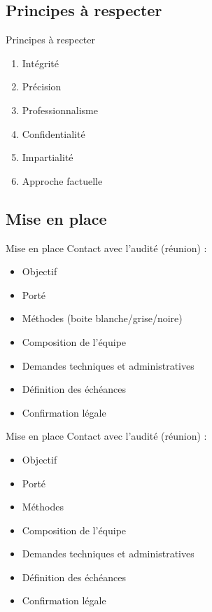 \documentclass{beamer}
\newcommand{\colorized}[1]{{\color{red}{#1}}}
\begin{document}
	\subsection{Principes à respecter}
	\begin{frame}{Principes à respecter}
		\begin{enumerate}
			\item Intégrité
			\item Précision
			\item Professionnalisme
			\item Confidentialité
			\item Impartialité
			\item Approche factuelle
		\end{enumerate}
	
	\end{frame}


	\subsection{Mise en place}
	\begin{frame}{Mise en place}
	     Contact avec l'audité (réunion) : 
		\begin{itemize}
			\item Objectif
			\item Porté
			\item Méthodes (boite blanche/grise/noire)
			\item Composition de l'équipe
			\item Demandes techniques et administratives
			\item Définition des échéances
			\item Confirmation légale
		\end{itemize}		
	\end{frame}

	\begin{frame}{Mise en place}
		Contact avec l'audité (réunion) : 
		\begin{itemize}
			\item Objectif \colorized{Garantir une application sans failles de l'OWASP Top 10}
			\item Porté \colorized{Application web}
			\item Méthodes \colorized{Boite blanche}
			\item Composition de l'équipe
			\item Demandes techniques et administratives \colorized{code source}
			\item Définition des échéances \colorized{\today}
			\item Confirmation légale
		\end{itemize}		
	\end{frame}
\end{document}
